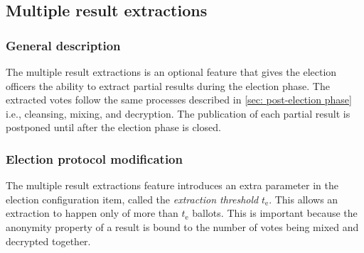 \subsection{Multiple result extractions} \label{app: multiple result extractions}


\subsubsection{General description}
The multiple result extractions is an optional feature that gives the election officers the ability to extract partial results during the election phase. The extracted votes follow the same processes described in \cref{sec: post-election phase} i.e., cleansing, mixing, and decryption. The publication of each partial result is postponed until after the election phase is closed.


\subsubsection{Election protocol modification}
The multiple result extractions feature introduces an extra parameter in the election configuration item, called the \textit{extraction threshold} $t_\mathrm{e}$. This allows an extraction to happen only of more than $t_\mathrm{e}$ ballots. This is important because the anonymity property of a result is bound to the number of votes being mixed and decrypted together.


